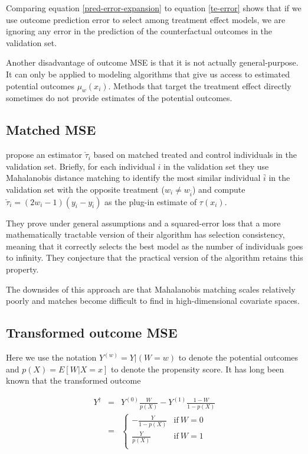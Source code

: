 Comparing equation \ref{pred-error-expansion} to equation \ref{te-error} shows that if we use outcome prediction error to select among treatment effect models, we are ignoring any error in the prediction of the counterfactual outcomes in the validation set. 

Another disadvantage of outcome MSE is that it is not actually general-purpose. It can only be applied to modeling algorithms that give us access to estimated potential outcomes $\mu_w(x_i)$. Methods that target the treatment effect directly sometimes do not provide estimates of the potential outcomes.

\subsection{Matched MSE}

\citet{Rolling:2013kz} propose an estimator $\check \tau_i$ based on matched treated and control individuals in the validation set. Briefly, for each individual $i$ in the validation set they use Mahalanobis distance matching to identify the most similar individual $\bar{i}$ in the validation set with the opposite treatment ($w_i \ne w_{\bar i}$) and compute $\check \tau_i = (2w_i -1)(y_i - y_{\bar i})$ as the plug-in estimate of $\tau(x_i)$. 

They prove under general assumptions and a squared-error loss that a more mathematically tractable version of their algorithm has selection consistency, meaning that it correctly selects the best model as the number of individuals goes to infinity. They conjecture that the practical version of the algorithm retains this property.

The downsides of this approach are that Mahalanobis matching scales relatively poorly and matches become difficult to find in high-dimensional covariate spaces.

\subsection{Transformed outcome MSE}

Here we use the notation $Y^{(w)} = Y|(W=w)$ to denote the potential outcomes and $p(X) = E[W|X=x]$ to denote the propensity score. It has long been known that the transformed outcome 

\begin{equation}
	\begin{array}{rcl}
	Y^{\dagger}  & = & Y^{(0)} \frac{W}{p(X)} - Y^{(1)} \frac{1-W}{1-p(X)} \\
	& = &
	\begin{cases}
		-\frac{Y}{1-p(X)} & \text{if} \ W=0 \\
		\frac{Y}{p(X)} & \text{if} \ W=1\\
	\end{cases} \\
	\end{array}
\end{equation}


